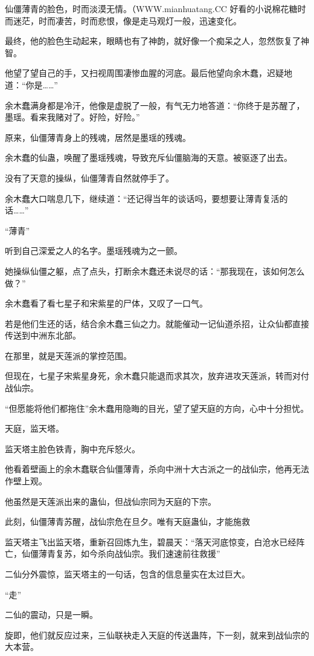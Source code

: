 \begin{this_body}
仙僵薄青的脸色，时而淡漠无情。（WWW.mianhuatang.CC 好看的小说棉花糖时而迷茫，时而凄苦，时而悲恨，像是走马观灯一般，迅速变化。

最终，他的脸色生动起来，眼睛也有了神韵，就好像一个痴呆之人，忽然恢复了神智。

他望了望自己的手，又扫视周围凄惨血腥的河底。最后他望向余木蠢，迟疑地道：“你是……”

余木蠢满身都是冷汗，他像是虚脱了一般，有气无力地答道：“你终于是苏醒了，墨瑶。看来我赌对了。好险，好险。”

原来，仙僵薄青身上的残魂，居然是墨瑶的残魂。

余木蠢的仙蛊，唤醒了墨瑶残魂，导致充斥仙僵脑海的天意。被驱逐了出去。

没有了天意的操纵，仙僵薄青自然就停手了。

余木蠢大口喘息几下，继续道：“还记得当年的谈话吗，要想要让薄青复活的话……”

“薄青”

听到自己深爱之人的名字。墨瑶残魂为之一颤。

她操纵仙僵之躯，点了点头，打断余木蠢还未说尽的话：“那我现在，该如何怎么做？”

余木蠢看了看七星子和宋紫星的尸体，又叹了一口气。

若是他们生还的话，结合余木蠢三仙之力。就能催动一记仙道杀招，让众仙都直接传送到中洲东北部。

在那里，就是天莲派的掌控范围。

但现在，七星子宋紫星身死，余木蠢只能退而求其次，放弃进攻天莲派，转而对付战仙宗。

“但愿能将他们都拖住”余木蠢用隐晦的目光，望了望天庭的方向，心中十分担忧。

天庭，监天塔。

监天塔主脸色铁青，胸中充斥怒火。

他看着壁画上的余木蠢联合仙僵薄青，杀向中洲十大古派之一的战仙宗，他再无法作壁上观。

他虽然是天莲派出来的蛊仙，但战仙宗同为天庭的下宗。

此刻，仙僵薄青苏醒，战仙宗危在旦夕。唯有天庭蛊仙，才能施救

监天塔主飞出监天塔，重新召回炼九生，碧晨天：“落天河底惊变，白沧水已经阵亡，仙僵薄青复苏，如今杀向战仙宗。我们速速前往救援”

二仙分外震惊，监天塔主的一句话，包含的信息量实在太过巨大。

“走”

二仙的震动，只是一瞬。

旋即，他们就反应过来，三仙联袂走入天庭的传送蛊阵，下一刻，就来到战仙宗的大本营。


\end{this_body}
